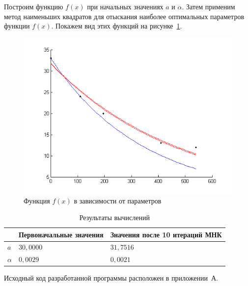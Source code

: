 Построим функцию $ f(x) $ при начальных значениях $ a $ и $ \alpha $. Затем
применим метод наименьших квадратов для отыскания наиболее оптимальных параметров
функции $ f(x) $. Покажем вид этих функций на рисунке~\ref{pic:appr}.
\begin{figure}[h!]
  \centering
  \includegraphics[width=1\linewidth]{pic/appr}
  \caption{Функция $ f(x) $ в зависимости от параметров}
  \label{pic:appr}
\end{figure}

\begin{table}[h!]
  \caption{Результаты вычислений}
  \label{tbl:results}
  \small{
    \centering
    \begin{tabular}{| p{} | p{} | p{} |}
      \hline

      & Первоначальные значения & Значения после 10 итераций МНК \\ \hline
      $a$       & $30{,}0000$ & $31{,}7516$ \\ \hline
      $\alpha$  & $0{,}0029$  & $0{,}0021$  \\

      \hline
    \end{tabular}
  }
\end{table}

Исходный код разработанной программы расположен в приложении~А.

\newpage

